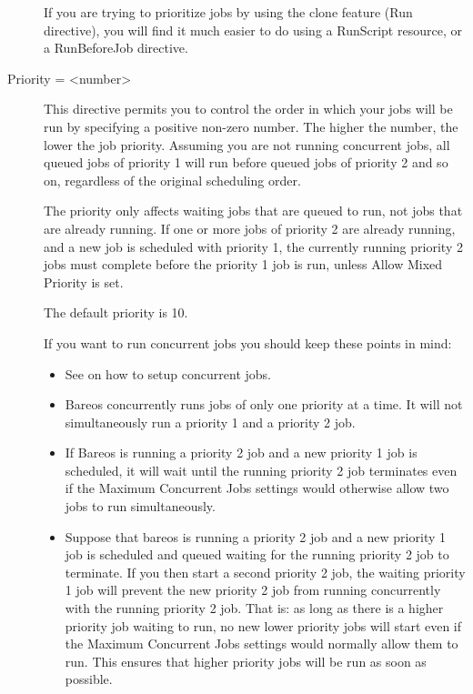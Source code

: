 \begin{description}
If you are trying to prioritize jobs by using the clone feature (Run
directive), you will find it much easier to do using a RunScript
resource, or a RunBeforeJob directive.

\label{Priority}
\item [Priority = {\textless}number{\textgreater}]
This directive permits you to control the order in which your jobs will
be run by specifying a positive non-zero number. The higher the number,
the lower the job priority. Assuming you are not running concurrent jobs,
all queued jobs of priority 1 will run before queued jobs of priority 2
and so on, regardless of the original scheduling order.

The priority only affects waiting jobs that are queued to run, not jobs
that are already running.  If one or more jobs of priority 2 are already
running, and a new job is scheduled with priority 1, the currently
running priority 2 jobs must complete before the priority 1 job is
run, unless Allow Mixed Priority is set.

The default priority is 10.

If you want to run concurrent jobs you should
keep these points in mind:

\begin{itemize}
\item See  on how to setup
concurrent jobs.

\item Bareos concurrently runs jobs of only one priority at a time.  It
will not simultaneously run a priority 1 and a priority 2 job.

\item If Bareos is running a priority 2 job and a new priority 1 job is
scheduled, it will wait until the running priority 2 job terminates even
if the Maximum Concurrent Jobs settings would otherwise allow two jobs
to run simultaneously.

\item Suppose that bareos is running a priority 2 job and a new priority 1
job is scheduled and queued waiting for the running priority 2 job to
terminate.  If you then start a second priority 2 job, the waiting
priority 1 job will prevent the new priority 2 job from running
concurrently with the running priority 2 job.  That is: as long as there
is a higher priority job waiting to run, no new lower priority jobs will
start even if the Maximum Concurrent Jobs settings would normally allow
them to run.  This ensures that higher priority jobs will be run as soon
as possible.
\end{itemize}


\end{description}
